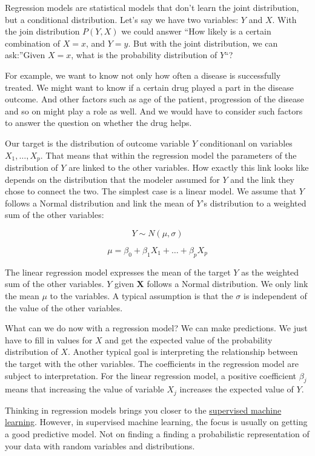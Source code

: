 \documentclass[
  10pt,
]{scrbook}
\begin{document}
Regression models are statistical models that don't learn the joint distribution, but a conditional distribution.
Let's say we have two variables: \(Y\) and \(X\).
With the join distribution \(P(Y,X)\) we could answer ``How likely is a certain combination of \(X=x\), and \(Y=y\).
But with the joint distribution, we can ask:''Given \(X=x\), what is the probability distribution of \(Y\)``?

For example, we want to know not only how often a disease is successfully treated.
We might want to know if a certain drug played a part in the disease outcome.
And other factors such as age of the patient, progression of the disease and so on might play a role as well.
And we would have to consider such factors to answer the question on whether the drug helps.

Our target is the distribution of outcome variable \(Y\) conditionanl on variables \(X_1, \ldots, X_p\).
That means that within the regression model the parameters of the distribution of \(Y\) are linked to the other variables.
How exactly this link looks like depends on the distribution that the modeler assumed for \(Y\) and the link they chose to connect the two.
The simplest case is a linear model.
We assume that \(Y\) follows a Normal distribution and link the mean of \(Y\)'s distribution to a weighted sum of the other variables:

\[Y \sim N(\mu, \sigma)\]

\[\mu = \beta_0 + \beta_1 X_1 + \ldots + \beta_p X_p\]

The linear regression model expresses the mean of the target \(Y\) as the weighted sum of the other variables.
\(Y\) given \(\mathbf{X}\) follows a Normal distribution.
We only link the mean \(\mu\) to the variables.
A typical assumption is that the \(\sigma\) is independent of the value of the other variables.

What can we do now with a regression model?
We can make predictions.
We just have to fill in values for \(X\) and get the expected value of the probability distribution of \(X\).
Another typical goal is interpreting the relationship between the target with the other variables.
The coefficients in the regression model are subject to interpretation.
For the linear regression model, a positive coefficient \(\beta_j\) means that increasing the value of variable \(X_j\) increases the expected value of \(Y\).

Thinking in regression models brings you closer to the \protect\hyperlink{mindset}{supervised machine learning}.
However, in supervised machine learning, the focus is usually on getting a good predictive model.
Not on finding a finding a probabilistic representation of your data with random variables and distributions.
\end{document}

